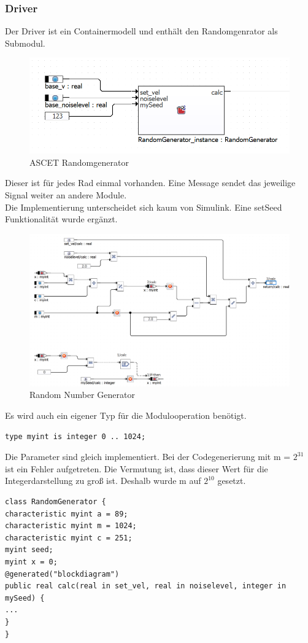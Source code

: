 \subsubsection{Driver}
Der Driver ist ein Containermodell und enthält den Randomgenrator als Submodul.
\begin{figure}[H]
	\centering
	\includegraphics[width=0.7\linewidth]{../Graphiken/ASCETRandomgen.png}
	\caption{ASCET Randomgenerator}
	\label{fig:ASCETRandom}
\end{figure}
Dieser ist für jedes Rad einmal vorhanden. Eine Message sendet das jeweilige Signal weiter an andere Module.\\
Die Implementierung unterscheidet sich kaum von Simulink. Eine setSeed Funktionalität wurde ergänzt.
\begin{figure}[H]
	\centering
	\includegraphics[width=1\linewidth]{../Graphiken/RandomGenerator.png}
	\caption{Random Number Generator}
	\label{fig:RandomGenerator}
\end{figure}
Es wird auch ein eigener Typ für die Modulooperation benötigt.
\begin{lstlisting}
type myint is integer 0 .. 1024;
\end{lstlisting}
Die Parameter sind gleich implementiert. Bei der Codegenerierung mit m = $2^{31}$ ist ein Fehler aufgetreten. Die Vermutung ist, dass dieser Wert für die Integerdarstellung zu groß ist. Deshalb wurde m auf $2^{10}$ gesetzt.
\begin{lstlisting}
class RandomGenerator {
characteristic myint a = 89;
characteristic myint m = 1024;
characteristic myint c = 251;
myint seed;
myint x = 0;
@generated("blockdiagram")
public real calc(real in set_vel, real in noiselevel, integer in mySeed) {
...
}
}
\end{lstlisting}

